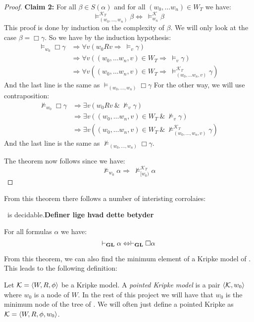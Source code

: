 \documentclass[../main.tex]{subfiles}
\begin{document}
\begin{proof}
	\textbf{Claim 2:} For all $\beta\in S(\alpha)$ and for all $(w_0,\ldots
	w_n)\in W_T$ we have:
	$$\vDash^{\mathcal{K}_T}_{(w_0,\ldots,w_n)}\beta\Leftrightarrow\ \vDash_{w_n}^\mathcal{K}\beta$$
	This proof is done by induction on the complexity of $\beta$. We will
	only look at the case $\beta=\Box\gamma$. So we have by the induction
	hypothesis:
	\begin{align*}
		\vDash_{w_0}\Box\gamma&\Rightarrow\forall v(w_0Rv\Rightarrow\ 
		\vDash_v\gamma)\\
				      &\Rightarrow\forall v((w_0,\ldots
				      w_n,v)\in W_T\Rightarrow\
				      \vDash_v\gamma)\\
				      &\Rightarrow\forall v((w_0,\ldots
				      w_n,v)\in W_T\Rightarrow\
				      \vDash_{(w_0,\ldots w_n,v)}^{\mathcal{K}_T}\gamma)
	\end{align*}
	And the last line is the same as $\vDash_{(w_0,\ldots,w_n)}\Box\gamma$
	For the other way, we will use contraposition:
	\begin{align*}
		\not\vDash_{w_0}\Box\gamma&\Rightarrow \exists v(w_0Rv\ \&\
		\not\vDash_v\gamma)\\
					  &\Rightarrow\exists v((w_0,\ldots
					  w_n,v)\in W_T\ \&\
					  \not\vDash_v\gamma)\\
					  &\Rightarrow\exists v((w_0,\ldots
					  w_n,v)\in W_T\ \&\
					  \not\vDash_{(w_0,\ldots,w_n,v)}^{\mathcal{K}_T}\gamma)
	\end{align*}
	And the last line is the same as
	$\not\vDash_{(w_0,\ldots,w_n)}\Box\gamma$. 

	The theorem now follows since we have:
	$$\not\vDash_{w_0}\alpha\Rightarrow\
	\not\vDash_{[w_0)}^{\mathcal{K}_T}\alpha$$
\end{proof}

From this theorem there follows a number of interisting corrolaies:

\begin{cor}
	\GL\ is decidable.\textbf{Definer lige hvad dette betyder}
\end{cor}
\begin{cor}
	\label{cor:Nec}
	For all formulas $\alpha$ we have:
	\[\vdash_{\text{\textbf{GL}}}\alpha\Leftrightarrow\vdash_{\text{\textbf{GL}}}\Box\alpha\]
\end{cor}

From this theorem, we can also find the minimum element of a Kripke model of
\GL. This leads to the following definition:

\begin{defi}
	Let $\mathcal{K}=\langle W,R,\phi\rangle$ be a Kripke model. A \textit{pointed
	Kripke model} is a pair $\langle \mathcal{K},w_0\rangle$ where $w_0$ is a node
	of $W$. In the rest of this project we will have that $w_0$ is the
	minimum node of the tree of \GL. We will often just define a pointed
	Kripke as $\mathcal{K}=\langle W,R,\phi,w_0\rangle$.
\end{defi}
\end{document}
